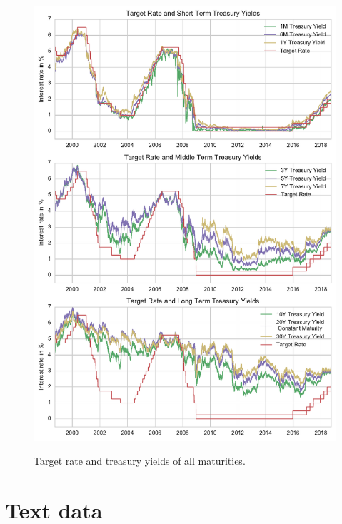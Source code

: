 \documentclass[11pt,a4paper,english,oneside]{book}
\numberwithin{equation}{chapter}
\begin{document}
\begin{figure}
	\caption{Target rate and treasury yields of all maturities.}
	\centering
	\includegraphics[scale=1]{Images/alltreasury.pdf}
	\label{alltreasury}
\end{figure}


\renewcommand{\theequation}{B.\arabic{equation}}


\chapter{Text data}\label{AppendixB}
\end{document}
